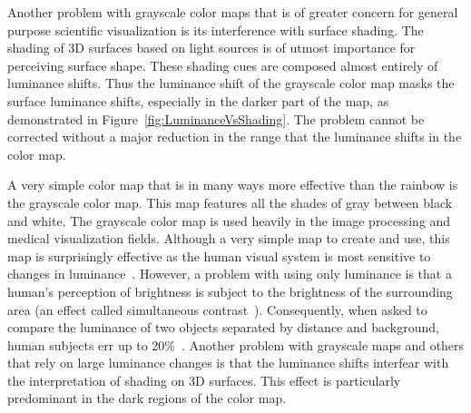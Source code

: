 \documentclass{llncs}
\newcommand{\lcite}[1]{~\cite{#1}}
\begin{document}
{  Another problem with grayscale color maps that is of greater concern for
  general purpose scientific visualization is its interference with surface
  shading.  The shading of 3D surfaces based on light sources is of utmost
  importance for perceiving surface shape.  These shading cues are composed
  almost entirely of luminance shifts.  Thus the luminance shift of the
  grayscale color map masks the surface luminance shifts, especially in the
  darker part of the map, as demonstrated in
  Figure~\ref{fig:LuminanceVsShading}.  The problem cannot be corrected
  without a major reduction in the range that the luminance shifts in the
  color map.

}{

  A very simple color map that is in many ways more effective than the
  rainbow is the grayscale color map.  This map features all the shades of
  gray between black and white.  The grayscale color map is used heavily in
  the image processing and medical visualization fields.  Although a very
  simple map to create and use, this map is surprisingly effective as the
  human visual system is most sensitive to changes in
  luminance\lcite{Mullen85,Ware04}.  However, a problem with using only
  luminance is that a human's perception of brightness is subject to the
  brightness of the surrounding area (an effect called simultaneous
  contrast\lcite{Stone05}).  Consequently, when asked to compare the
  luminance of two objects separated by distance and background, human
  subjects err up to 20\%\lcite{Ware88}.  Another problem with grayscale
  maps and others that rely on large luminance changes is that the
  luminance shifts interfear with the interpretation of shading on 3D
  surfaces.  This effect is particularly predominant in the dark regions of
  the color map.

}
\end{document}
